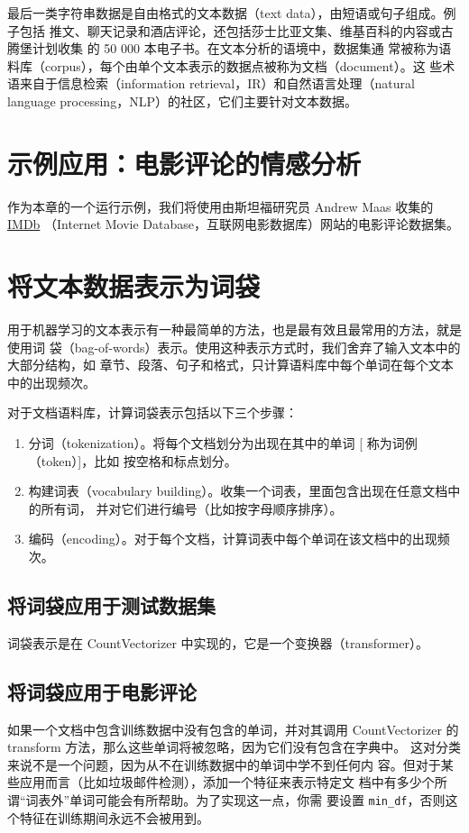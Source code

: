 最后一类字符串数据是自由格式的文本数据（text data），由短语或句子组成。例子包括
推文、聊天记录和酒店评论，还包括莎士比亚文集、维基百科的内容或古腾堡计划收集
的 50 000 本电子书。在文本分析的语境中，数据集通
常被称为语料库（corpus），每个由单个文本表示的数据点被称为文档（document）。这
些术语来自于信息检索（information retrieval，IR）和自然语言处理（natural language
processing，NLP）的社区，它们主要针对文本数据。
\section{示例应用：电影评论的情感分析}
作为本章的一个运行示例，我们将使用由斯坦福研究员 Andrew Maas 收集的 \href{http://ai.stanford.edu/~amaas/data/sentiment/}{IMDb}
（Internet Movie Database，互联网电影数据库）网站的电影评论数据集。
\section{将文本数据表示为词袋}
用于机器学习的文本表示有一种最简单的方法，也是最有效且最常用的方法，就是使用词
袋（bag-of-words）表示。使用这种表示方式时，我们舍弃了输入文本中的大部分结构，如
章节、段落、句子和格式，只计算语料库中每个单词在每个文本中的出现频次。

对于文档语料库，计算词袋表示包括以下三个步骤：
\begin{enumerate}
    \item 分词（tokenization）。将每个文档划分为出现在其中的单词 [ 称为词例（token）]，比如
          按空格和标点划分。
    \item 构建词表（vocabulary building）。收集一个词表，里面包含出现在任意文档中的所有词，
          并对它们进行编号（比如按字母顺序排序）。
    \item 编码（encoding）。对于每个文档，计算词表中每个单词在该文档中的出现频次。
\end{enumerate}
\subsection{将词袋应用于测试数据集}
词袋表示是在 CountVectorizer 中实现的，它是一个变换器（transformer）。
\subsection{将词袋应用于电影评论}

\begin{tcolorbox}
    如果一个文档中包含训练数据中没有包含的单词，并对其调用 CountVectorizer
    的 transform 方法，那么这些单词将被忽略，因为它们没有包含在字典中。
    这对分类来说不是一个问题，因为从不在训练数据中的单词中学不到任何内
    容。但对于某些应用而言（比如垃圾邮件检测），添加一个特征来表示特定文
    档中有多少个所谓“词表外”单词可能会有所帮助。为了实现这一点，你需
    要设置 \verb|min_df|，否则这个特征在训练期间永远不会被用到。
\end{tcolorbox}
